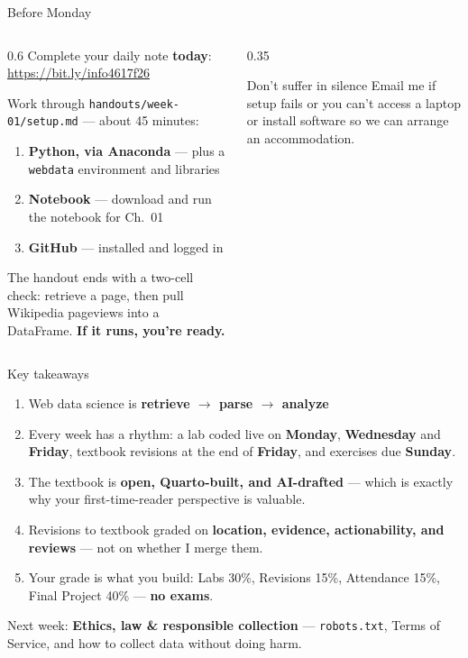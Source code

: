 \documentclass[9pt,aspectratio=169]{beamer}
\begin{document}
\begin{frame}{Before Monday}
    \begin{columns}[T]
        \begin{column}{0.6\textwidth}
            Complete your daily note \textbf{today}: \url{https://bit.ly/info4617f26}

            \bigskip
            Work through \texttt{handouts/week-01/setup.md} --- about 45 minutes:
            \begin{enumerate}
                \item \textbf{Python, via Anaconda} --- plus a \texttt{webdata} environment and libraries
                \item \textbf{Notebook} --- download and run the notebook for Ch.~01
                \item \textbf{GitHub} --- installed and logged in
            \end{enumerate}
            \medskip
            The handout ends with a two-cell check: retrieve a page, then pull Wikipedia pageviews into a DataFrame. \textbf{If it runs, you're ready.}
        \end{column}
        \begin{column}{0.35\textwidth}
            \begin{alertblock}{Don't suffer in silence}
                \footnotesize Email me if setup fails or you can't access a laptop or install software so we can arrange an accommodation.
            \end{alertblock}
        \end{column}
    \end{columns}
\end{frame}

\begin{frame}{Key takeaways}
    \begin{enumerate}
        \item Web data science is \textbf{retrieve $\rightarrow$ parse $\rightarrow$ analyze}
        \item Every week has a rhythm: a lab coded live on \textbf{Monday}, \textbf{Wednesday} and \textbf{Friday}, textbook revisions at the end of \textbf{Friday}, and exercises due \textbf{Sunday}.
        \item The textbook is \textbf{open, Quarto-built, and AI-drafted} --- which is exactly why your first-time-reader perspective is valuable.
        \item Revisions to textbook graded on \textbf{location, evidence, actionability, and reviews} --- not on whether I merge them.
        \item Your grade is what you build: Labs 30\%, Revisions 15\%, Attendance 15\%, Final Project 40\% --- \textbf{no exams}.
    \end{enumerate}
    \medskip
    \centering\small Next week: \textbf{Ethics, law \& responsible collection} --- \texttt{robots.txt}, Terms of Service, and how to collect data without doing harm.
\end{frame}
\end{document}
